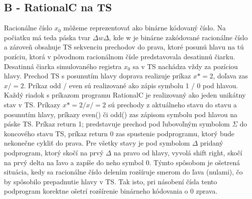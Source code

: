 \documentclass[10pt]{article}
\begin{document}
\subsection*{B - RationalC na TS}
Racionálne číslo $x_0$ môžeme reprezentovať ako binárne kódovaný číslo. Na počiatku má teda páska
tvar $\Delta w \Delta$, kde w je binárne zakódované racionálne číslo a zároveň obsahuje TS sekvenciu
prechodov do prava, ktoré posunú hlavu na tú pozíciu, ktorá v pôvodnom racionálnom čísle
predstavovala desatinnú čiarku. Desatinná čiarka simulovaného registra $x_0$ sa v TS nachádza vždy
za pozíciou hlavy.
Prechod TS s posunutím hlavy doprava realizuje príkaz $x *= 2$, doľava zas $x /= 2$. Príkaz odd /
even sú realizované ako zápis symbolu 1 / 0 pod hlavou.
Každý riadok s príkazom programu RationalC je realizovaný ako jeden unikátny stav v TS.
Príkazy $x *= 2 / x /= 2$ sú prechody z aktuálneho stavu do stavu a posunutím hlavy,
príkazy even() či odd() zas zápisom symbolu pod hlavou na páske TS.
Príkaz return 1; predstavuje prechod pod ľubovoľným symbolom $\Sigma$ do koncového stavu TS,
príkaz return 0 zas spustenie podprogramu, ktorý bude nekonečne cykliť do prava.
Pre všetky stavy je pod symbolom $\Delta$ pridaný podprogram, ktorý skočí na prvý $\Delta$ na pravo od
hlavy, vyvolá shift right, skočí na prvý delta na ľavo a zapíše do neho symbol 0.
Týmto spôsobom je ošetrená situácia, kedy sa racionálne číslo delením rozšíruje smerom do ľava
(nulami), čo by spôsobilo prepadnutie hlavy v TS. 
Tak isto, pri násobení čísla tento podprogram korektne ošetrí rozšírenie binárneho kódovania o 0
zprava.
\end{document}
